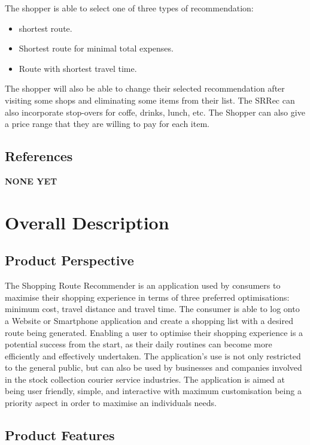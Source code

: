 \documentclass[10pt, a4paper, onecolumn]{scrartcl}
\begin{document}
		The shopper is able to select one of three types of recommendation:
		\begin{itemize}
			\item shortest route.
			\item Shortest route for minimal total expenses.
			\item Route with shortest travel time.
		\end{itemize}
		
		The shopper will also be able to change their selected recommendation after visiting some shops and eliminating some items from their list. The SRRec can also incorporate stop-overs for coffe, drinks, lunch, etc. The Shopper can also give a price range that they are willing to pay for each item.
		
		\subsection{References}
		
		\textbf{NONE YET}
		
	\section{Overall Description}
	
		\subsection{Product Perspective}
		
			The Shopping Route Recommender is an application used by consumers to maximise their shopping experience in terms of three preferred optimisations: minimum cost, travel distance and travel time. The consumer is able to log onto a Website or Smartphone application and create a shopping list with a desired route being generated.  Enabling a user to optimise their shopping experience is a potential success from the start, as their daily routines can become more efficiently and effectively undertaken. The application's use is not only restricted to the general public, but can also be used by businesses and companies involved in the stock collection courier service industries. The application is aimed at being user friendly, simple, and interactive with maximum customisation being a priority aspect in order to maximise an individuals needs. 
		
		\subsection{Product Features}
		
\end{document}
